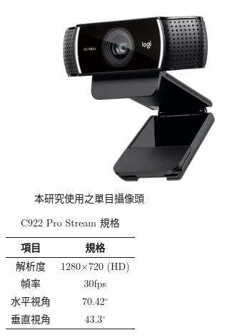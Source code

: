 \documentclass[12pt]{article}       %
\begin{document}
\begin{figure}[H]
    \centering
    \includegraphics[width=0.7\textwidth]{c922.jpg}     %
    \caption{本研究使用之單目攝像頭\cite{logitech}}    %
    \label{fig:c922}    %
\end{figure}

\begin{table}[H]
    \caption{C922 Pro Stream 規格}
    \vspace{12pt} %
    \renewcommand{\arraystretch}{1.5} %
    \centering
    \begin{tabular}{|c|c|}
        \hline
        項目   & 規格              \\ \hline
        解析度  & 1280$\times$720 (HD) \\ \hline
        幀率   & 30fps           \\ \hline
        水平視角 & 70.42$^\circ$         \\ \hline
        垂直視角 & 43.3$^\circ$           \\ \hline
    \end{tabular}
    \label{tab:C922 Pro}
\end{table}
\end{document}
